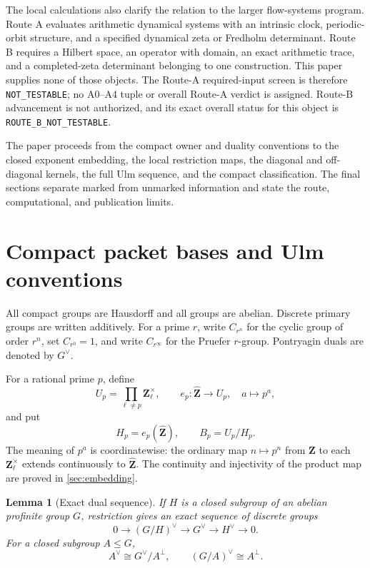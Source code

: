 \documentclass[11pt]{article}
\newtheorem{lemma}[theorem]{Lemma}
\theoremstyle{definition}
\begin{document}
The local calculations also clarify the relation to the larger flow-systems
program.  Route A evaluates arithmetic dynamical systems with an intrinsic
clock, periodic-orbit structure, and a specified dynamical zeta or Fredholm
determinant.  Route B requires a Hilbert space, an operator with domain, an
exact arithmetic trace, and a completed-zeta determinant belonging to one
construction.  This paper supplies none of those objects.  The Route-A
required-input screen is therefore \texttt{NOT\_TESTABLE}; no A0--A4 tuple or
overall Route-A verdict is assigned.  Route-B advancement is not authorized, and
its exact overall status for this object is
\texttt{ROUTE\_B\_NOT\_TESTABLE}.

The paper proceeds from the compact owner and duality conventions to the
closed exponent embedding, the local restriction maps, the diagonal and
off-diagonal kernels, the full Ulm sequence, and the compact classification.
The final sections separate marked from unmarked information and state the
route, computational, and publication limits.

\section{Compact packet bases and Ulm conventions}\label{sec:preliminaries}

All compact groups are Hausdorff and all groups are abelian.  Discrete
primary groups are written additively.  For a prime $r$, write $C_{r^n}$ for
the cyclic group of order $r^n$, set $C_{r^0}=1$, and write
$C_{r^\infty}$ for the Pruefer $r$-group.  Pontryagin duals are denoted by
$G^\vee$.

For a rational prime $p$, define
\begin{equation}\label{eq:owner}
 U_p=\prod_{\ell\ne p}\mathbf Z_\ell^\times,
 \qquad
 e_p:\widehat{\mathbf Z}\longrightarrow U_p,
 \quad a\longmapsto p^a,
\end{equation}
and put
\begin{equation}\label{eq:quotient}
 H_p=e_p(\widehat{\mathbf Z}),
 \qquad
 B_p=U_p/H_p.
\end{equation}
The meaning of $p^a$ is coordinatewise: the ordinary map
$n\mapsto p^n$ from $\mathbf Z$ to each $\mathbf Z_\ell^\times$ extends
continuously to $\widehat{\mathbf Z}$.  The continuity and injectivity of the
product map are proved in \cref{sec:embedding}.

\begin{lemma}[Exact dual sequence]\label{lem:dual-sequence}
If $H$ is a closed subgroup of an abelian profinite group $G$, restriction
gives an exact sequence of discrete groups
\begin{equation}\label{eq:dual-sequence}
0\longrightarrow (G/H)^\vee\longrightarrow G^\vee
\longrightarrow H^\vee\longrightarrow0.
\end{equation}
For a closed subgroup $A\le G$,
\begin{equation}\label{eq:annihilator-duality}
A^\vee\cong G^\vee/A^\perp,
\qquad
(G/A)^\vee\cong A^\perp.
\end{equation}
\end{lemma}
\end{document}
